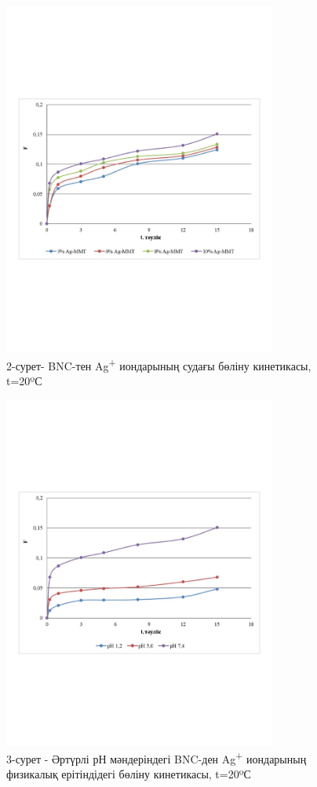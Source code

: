 \begin{figure}[H]
	\centering
	\includegraphics[width=0.8\textwidth]{media/chem/image15}
	\caption*{2-сурет- BNC-тен Ag\textsuperscript{+} иондарының судағы бөліну
кинетикасы, t=20ºС}
\end{figure}

\begin{figure}[H]
	\centering
	\includegraphics[width=0.8\textwidth]{media/chem/image16}
	\caption*{3-сурет - Әртүрлі рН мәндеріндегі BNC-ден Ag\textsuperscript{+}
иондарының физикалық ерітіндідегі бөліну кинетикасы, t=20ºС}
\end{figure}

